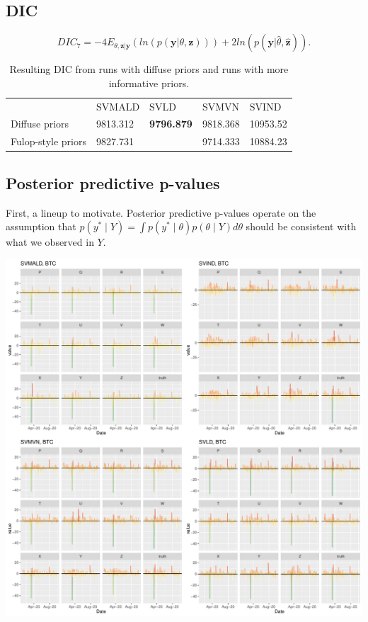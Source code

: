 \documentclass{article}\usepackage[]{graphicx}\usepackage[]{color}
\begin{document}
\clearpage
\newpage

\subsection{DIC}
 $$DIC_7 = -4E_{\theta,\boldsymbol{z} | \boldsymbol{y}}(ln(p(\boldsymbol{y}|\theta,\boldsymbol{z}))) + 2ln(p(\boldsymbol{y}|\hat{\theta}, \hat{\boldsymbol{z}})).$$ 
 
\begin{table}[]
\begin{tabular}{lllll}
                   & SVMALD  & SVLD    & SVMVN   & SVIND \\
Diffuse priors     &9813.312 &\textbf{9796.879} &9818.368 &10953.52 \\
Fulop-style priors &9827.731 &         &9714.333 &10884.23
\end{tabular}
\caption{\label{tab:dic7} Resulting DIC from runs with diffuse priors and runs with more informative priors. }
\end{table}
 

\subsection{Posterior predictive p-values}

First, a lineup to motivate. Posterior predictive p-values operate on the assumption that $p(y^* \mid Y) = \int p(y^* \mid \theta)p(\theta \mid Y) d \theta$ should be consistent with what we observed in $Y$.

\includegraphics[width = .9\linewidth]{"lineup_BTC.pdf"}
\end{document}
